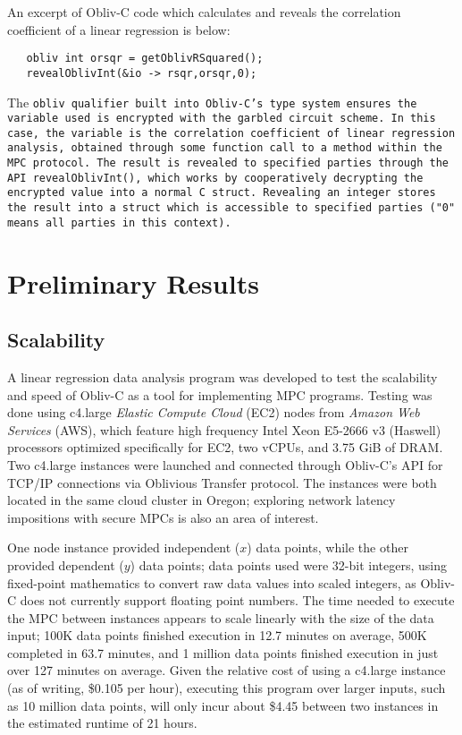 \documentclass[conference]{IEEEtran}
\begin{document}
An excerpt of Obliv-C code which calculates and reveals the correlation
coefficient of a linear regression is below:

\begin{verbatim}
   obliv int orsqr = getOblivRSquared();
   revealOblivInt(&io -> rsqr,orsqr,0);
\end{verbatim}
\noindent
The \tt{obliv} qualifier built into Obliv-C's type system ensures the
variable used is encrypted with the garbled circuit
scheme\cite{cryptoeprint:2015:1153}. In this case, the variable is the
correlation coefficient of linear regression analysis, obtained through
some function call to a method within the MPC protocol. The result is
revealed to specified parties through the API \tt{revealOblivInt()},
which works by cooperatively decrypting the encrypted value into a
normal C struct.  Revealing an integer stores the result into a struct
which is accessible to specified parties ("0" means all parties in this
context).

\section{Preliminary Results}
\subsection{Scalability}
A linear regression data analysis program was developed to test the scalability 
and speed of Obliv-C as a tool for implementing MPC programs. 
Testing was done using c4.large \emph{Elastic Compute Cloud} (EC2) nodes from \emph{Amazon Web Services} (AWS)\cite{aws:ec2}, which feature 
high frequency Intel Xeon E5-2666 v3 (Haswell) processors optimized specifically for EC2,
two vCPUs, and 3.75 GiB of DRAM.
Two c4.large instances were launched and connected through 
Obliv-C's API for TCP/IP connections via Oblivious Transfer protocol. The instances 
were both located in the same cloud cluster in Oregon; exploring network latency 
impositions with secure MPCs is also an area of interest.

One node instance provided independent ($x$) data points, while the other provided 
dependent ($y$) data points; data points used were 32-bit integers, using fixed-point 
mathematics to convert raw data values into scaled integers, as 
Obliv-C does not currently support floating point numbers.
The time needed to execute the MPC between instances appears to scale linearly 
with the size of the data input; 100K data points finished execution in 12.7 minutes 
on average, 500K completed in 63.7 minutes, and 1 million data points finished execution 
in just over 127 minutes on average. Given the relative cost of using a c4.large instance
(as of writing, \$0.105 per hour), executing this program over larger inputs, such as
10 million data points, will only incur about \$4.45 between two instances in the 
estimated runtime of 21 hours.
\end{document}
